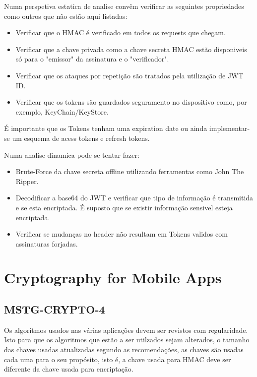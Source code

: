 Numa perspetiva estatica de analise convêm verificar as seguintes propriedades como outros que não estão aqui listadas:

\begin{itemize}

\item Verificar que o HMAC é verificado em todos os requests que chegam.
\item Verificar que a chave privada como a chave secreta HMAC estão disponiveis só para o "emissor" da assinatura e o "verificador".
\item Verificar que os ataques por repetição são tratados pela utilização de JWT ID.
\item Verificar que os tokens são guardados seguramento no dispositivo como, por exemplo, KeyChain/KeyStore.

\end{itemize}

É importante que os Tokens tenham uma expiration date ou ainda implementar-se um esquema de acess tokens e refresh tokens.

Numa analise dinamica pode-se tentar fazer:
\begin{itemize}

\item Brute-Force da chave secreta offline utilizando ferramentas como John The Ripper.

\item Decodificar a base64 do JWT e verificar que tipo de informação é transmitida e se esta encriptada. É suposto que se existir informação sensivel esteja encriptada. 

\item Verificar se mudanças no header não resultam em Tokens validos com assinaturas forjadas.

\end{itemize}

\section{Cryptography for Mobile Apps}

\subsection{MSTG-CRYPTO-4}

Os algoritmos usados nas várias aplicações devem ser revistos com regularidade. Isto para que os algoritmos que estão a ser utilzados sejam alterados, o tamanho das chaves usadas atualizadas segundo as recomendações, as chaves são usadas cada uma para o seu propósito, isto é, a chave usada para HMAC deve ser diferente da chave usada para encriptação.

